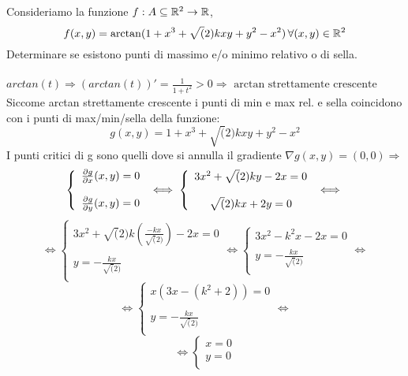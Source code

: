\begin{eexercise}[Es. 3, Provetta]
  Consideriamo la funzione $\f$, $$f(x,y) = \arctan(1+x^3+\sqrt(2)kxy+y^2-x^2) \, \forall(x,y)\in\R^2$$
  Determinare se esistono punti di massimo e/o minimo relativo o di sella. \\\\
  $arctan(t) \Rightarrow (arctan(t))' = \frac{1}{1+t^2} > 0 \Rightarrow \text{ arctan strettamente crescente}$
  Siccome arctan \ace strettamente crescente i punti di min e max rel. e sella coincidono con i punti
  di max/min/sella della funzione:
  $$g(x,y) = 1+x^3+\sqrt(2)kxy+y^2-x^2$$
  I punti critici di g sono quelli dove si annulla il gradiente $\nabla g(x,y) = (0,0) \Rightarrow$
  $$\left\{
    \begin{array}{c}
      \frac{\p g}{\p x}(x,y) = 0 \\
      \\
      \frac{\p g}{\p y}(x,y) = 0 \\
    \end{array}
  \right. \iff 
  \left\{
    \begin{array}{c}
      3x^2 + \sqrt(2)ky - 2x = 0 \\
      \\
      \sqrt(2)kx + 2y = 0 \\
    \end{array}
  \right. \iff $$
  $$\iff \left\{
    \begin{array}{c}
      3x^2 + \sqrt(2) k\left(\frac{-kx}{\sqrt(2)}\right) - 2x = 0 \\
      \\
      y = -\frac{kx}{\sqrt(2)} \\
    \end{array}
  \right. \iff \left\{
    \begin{array}{c}
      3x^2 - k^2x -2x = 0 \\
      \\
      y = -\frac{kx}{\sqrt(2)} \\
    \end{array}
  \right. \iff $$
  $$\iff \left\{
    \begin{array}{c}
      x(3x-(k^2+2)) = 0 \\
      \\
      y = -\frac{kx}{\sqrt(2)} \\
    \end{array}
  \right. \iff$$ $$ \iff \left\{ \begin{array}{c}
    x = 0 \\
    y = 0 \\

\end{array}$$
\end{eexercise}
